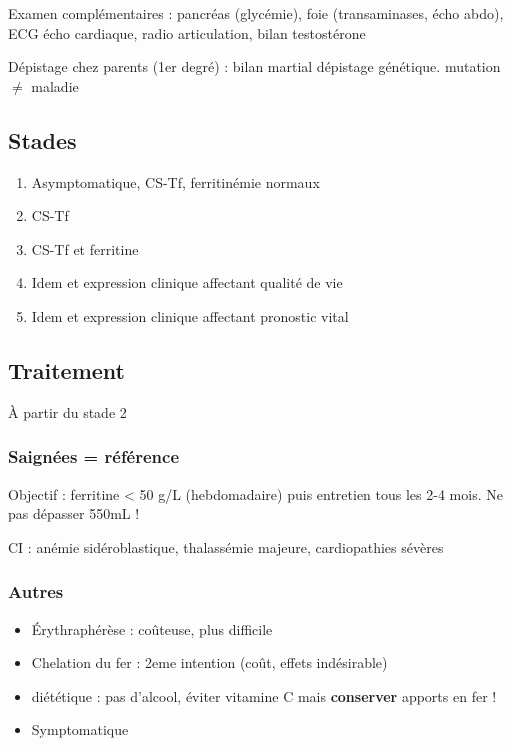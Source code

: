 \documentclass[11pt]{article}
\begin{document}
Examen complémentaires : pancréas (glycémie),  foie (transaminases, écho abdo), ECG \textpm{} écho
cardiaque, radio articulation, bilan testostérone

Dépistage chez parents (1er degré) : bilan martial \textpm{} dépistage génétique. \danger mutation \(\neq\) maladie

\subsection{Stades}
\label{sec:orgd03df85}
\begin{enumerate}
\item Asymptomatique, CS-Tf, ferritinémie normaux
\item CS-Tf \inc
\item CS-Tf \inc et ferritine \inc
\item Idem et expression clinique affectant qualité de vie
\item Idem et expression clinique affectant pronostic vital
\end{enumerate}

\subsection{Traitement}
\label{sec:org4f5d319}
À partir du stade 2

\subsubsection{Saignées = référence}
\label{sec:orgecce015}
Objectif : ferritine < 50 g/L (hebdomadaire) puis entretien tous les
  2-4 mois. Ne pas dépasser 550mL !

CI : anémie sidéroblastique, thalassémie majeure, cardiopathies sévères

\subsubsection{Autres}
\label{sec:org9cb20c2}
\begin{itemize}
\item Érythraphérèse : coûteuse, plus difficile
\item Chelation du fer : 2eme intention (coût, effets indésirable)
\item diététique : pas d'alcool, éviter vitamine C mais \textbf{conserver} apports en fer !
\item Symptomatique
\end{itemize}
\end{document}

